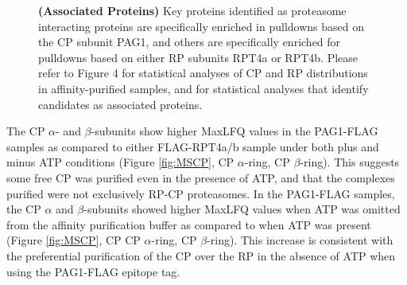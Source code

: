 \begin{figure}
	\ContinuedFloat
	{\textbf{(Associated Proteins)} Key proteins identified as proteasome interacting proteins are specifically enriched in pulldowns based on the CP subunit PAG1, and others are specifically enriched for pulldowns based on either RP subunits RPT4a or RPT4b. Please refer to Figure 4 for statistical analyses of CP and RP distributions in affinity-purified samples, and for statistical analyses that identify candidates as associated proteins.}
	\label{fig:MSAssociated}
\end{figure}

The CP $\alpha$- and $\beta$-subunits show higher MaxLFQ values in the PAG1-FLAG samples as compared to either FLAG-RPT4a/b sample under both plus and minus ATP conditions (Figure \ref{fig:MSCP}, CP $\alpha$-ring, CP $\beta$-ring). This suggests some free CP was purified even in the presence of ATP, and that the complexes purified were not exclusively RP-CP proteasomes. In the PAG1-FLAG samples, the CP $\alpha$ and $\beta$-subunits showed higher MaxLFQ values when ATP was omitted from the affinity purification buffer as compared to when ATP was present (Figure \ref{fig:MSCP}, CP CP $\alpha$-ring, CP $\beta$-ring). This increase is consistent with the preferential purification of the CP over the RP in the absence of ATP when using the PAG1-FLAG epitope tag.

